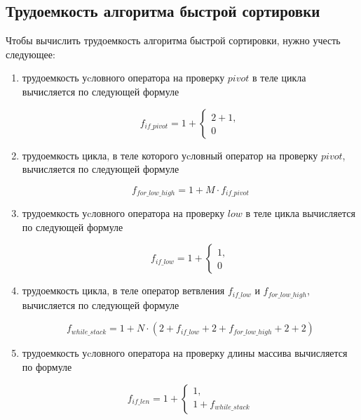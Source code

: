 \subsection{Трудоемкость алгоритма быстрой сортировки}

Чтобы вычислить трудоемкость алгоритма быстрой сортировки, нужно учесть следующее:

\begin{enumerate}[label=---]
		
	\item трудоемкость уcловного оператора на проверку $pivot$ в теле цикла вычисляется по следующей формуле
	
	\begin{equation}
	\label{eq:2.1}
	f_{if\_pivot} = 1 + 
	\begin{cases}
	2 + 1, \\
	0
	\end{cases}
	\end{equation}		

	\item трудоемкость цикла, в теле которого уcловный оператор на проверку $pivot$, вычисляется по следующей формуле

	\begin{equation}
	\label{eq:2.2}
	f_{for\_low\_high} = 1 + M \cdot f_{if\_pivot}
	\end{equation}

	\item трудоемкость уcловного оператора на проверку $low$ в теле цикла вычисляется по следующей формуле

	\begin{equation}
	\label{eq:2.2}
	f_{if\_low
	} = 1 + 
	\begin{cases}
	1, \\
	0
	\end{cases}
	\end{equation}		

	\item трудоемкость цикла, в теле оператор ветвления $f_{if\_low}$ и $f_{for\_low\_high}$, вычисляется по следующей формуле

	\begin{equation}
	\label{eq:2.3}
	f_{while\_stack} = 1 + N \cdot (2 + f_{if\_low} + 2 + f_{for\_low\_high}
	+ 2 + 2)
	\end{equation}
	
	\item трудоемкость уcловного оператора на проверку длины массива вычисляется по формуле
	
	\begin{equation}
	\label{eq:2.4}
	f_{if\_len} = 1 + 
	\begin{cases}
	1, \\
	1 + f_{while\_stack}
	\end{cases}
	\end{equation}	
		
\end{enumerate}
		

